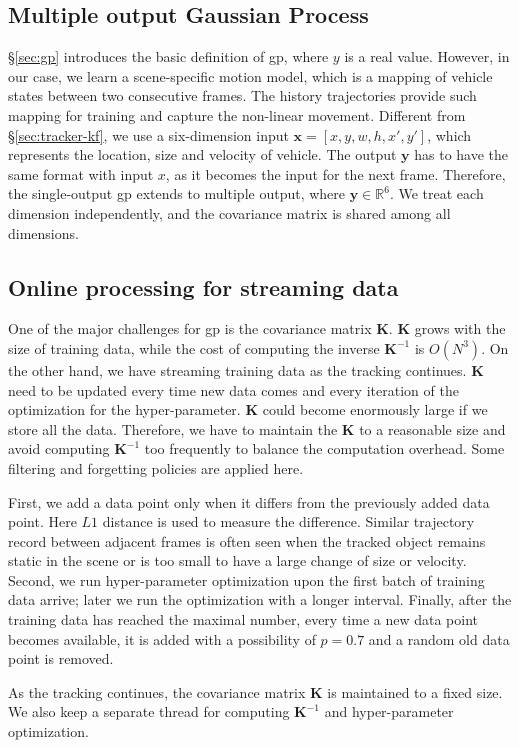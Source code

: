 \subsection{Multiple output Gaussian Process}

\S\ref{sec:gp} introduces the basic definition of \gls{gp}, where $y$ is a real value.
However, in our case, we learn a scene-specific motion model, which is a mapping of vehicle states between two consecutive frames. 
The history trajectories provide such mapping for training and capture the non-linear movement.
Different from \S\ref{sec:tracker-kf}, we use a six-dimension input $\mathbf{x} = [x, y, w, h, x', y']$, which represents the location, size and velocity of vehicle. 
The output $\mathbf{y}$ has to have the same format with input $x$, as it becomes the input for the next frame.
Therefore, the single-output \gls{gp} extends to multiple output, where $\mathbf{y} \in \mathbb{R}^{6}$. 
We treat each dimension independently, and the covariance matrix is shared among all dimensions.

\subsection{Online processing for streaming data}

One of the major challenges for \gls{gp} is the covariance matrix $\mathbf{K}$. 
$\mathbf{K}$ grows with the size of training data, while the cost of computing the inverse $\mathbf{K}^{-1}$ is $O(N^3)$.
On the other hand, we have streaming training data as the tracking continues. 
$\mathbf{K}$ need to be updated every time new data comes and every iteration of the optimization for the hyper-parameter.
$\mathbf{K}$ could become enormously large if we store all the data. 
Therefore, we have to maintain the $\mathbf{K}$ to a reasonable size and avoid computing $\mathbf{K}^{-1}$ too frequently to balance the computation overhead.
Some filtering and forgetting policies are applied here.

First, we add a data point only when it differs from the previously added data point.
Here $L1$ distance is used to measure the difference. 
Similar trajectory record between adjacent frames is often seen when the tracked object remains static in the scene or is too small to have a large change of size or velocity.
Second, we run hyper-parameter optimization upon the first batch of training data arrive; later we run the optimization with a longer interval.
Finally, after the training data has reached the maximal number, every time a new data point becomes available, it is added with a possibility of $p = 0.7$ and a random old data point is removed.

As the tracking continues, the covariance matrix $\mathbf{K}$ is maintained to a fixed size. 
We also keep a separate thread for computing $\mathbf{K}^{-1}$ and hyper-parameter optimization. 


